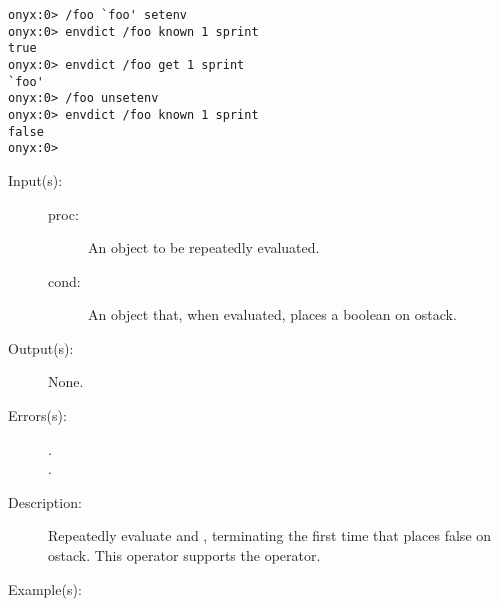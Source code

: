 \begin{description}
\begin{description}
\begin{verbatim}
onyx:0> /foo `foo' setenv
onyx:0> envdict /foo known 1 sprint
true
onyx:0> envdict /foo get 1 sprint
`foo'
onyx:0> /foo unsetenv
onyx:0> envdict /foo known 1 sprint
false
onyx:0>
		\end{verbatim}
	\end{description}
\label{systemdict:until}
\item[{\onyxop{proc cond}{until}{--}}: ]
	\begin{description}\item[]
	\item[Input(s): ]
		\begin{description}\item[]
		\item[proc: ]
			An object to be repeatedly evaluated.
		\item[cond: ]
			An object that, when evaluated, places a boolean on
			ostack.
		\end{description}
	\item[Output(s): ] None.
	\item[Errors(s): ]
		\begin{description}\item[]
		\item[.]
		\item[.]
		\end{description}
	\item[Description: ]
		Repeatedly evaluate  and , terminating
		the first time that  places false on ostack.  This
		operator supports the
		 operator.
	\item[Example(s): ]\begin{verbatim}


\end{verbatim}
\end{description}
\end{description}
